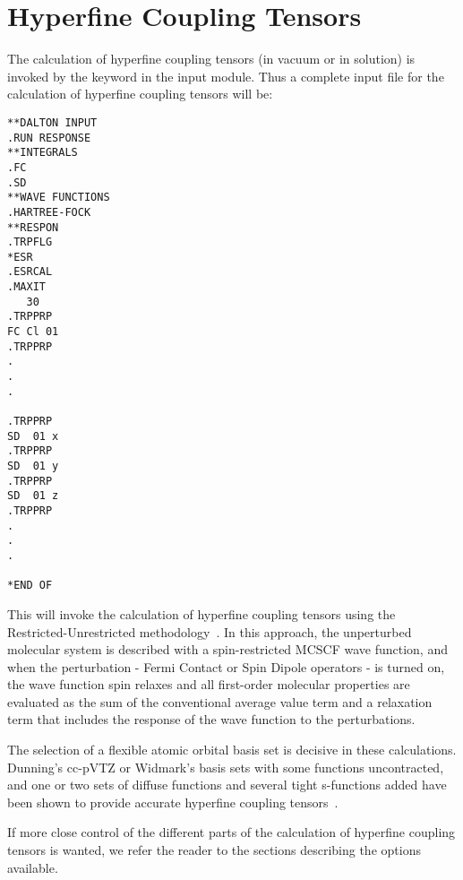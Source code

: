 \section{Hyperfine Coupling Tensors}

\begin{center}
\end{center}

    The calculation of hyperfine coupling tensors (in vacuum or in
solution) is invoked by the keyword  in the 
input module. Thus a complete input file for the calculation of
hyperfine coupling tensors will be:

\begin{verbatim}
**DALTON INPUT
.RUN RESPONSE
**INTEGRALS
.FC
.SD
**WAVE FUNCTIONS
.HARTREE-FOCK
**RESPON
.TRPFLG
*ESR
.ESRCAL
.MAXIT
   30
.TRPPRP
FC Cl 01
.TRPPRP
.
.
.

.TRPPRP
SD  01 x
.TRPPRP
SD  01 y
.TRPPRP
SD  01 z
.TRPPRP
.
.
.

*END OF
\end{verbatim}

    This will invoke the calculation of hyperfine
coupling tensors
using the Restricted-Unrestricted
methodology~\cite{bfpjjbjothhjajjcp97}. In this approach, the
unperturbed molecular system is described with a spin-restricted MCSCF
wave function, and when the perturbation - Fermi Contact or Spin Dipole
operators - is turned on, the wave function spin relaxes and all
first-order molecular properties are evaluated as the sum of the
conventional average value term and a relaxation term that includes
the response of the wave function to the perturbations.

    The selection of a flexible atomic orbital basis set is decisive
in these calculations. Dunning's cc-pVTZ or Widmark's basis sets with some
functions uncontracted, and one or two sets of diffuse functions and
several tight s-functions added have been shown to provide accurate
hyperfine coupling tensors~\cite{bfpjcpl232}.

    If more close control of the different parts of the calculation
of hyperfine coupling tensors is wanted, we refer the reader to the
sections describing the options available.
